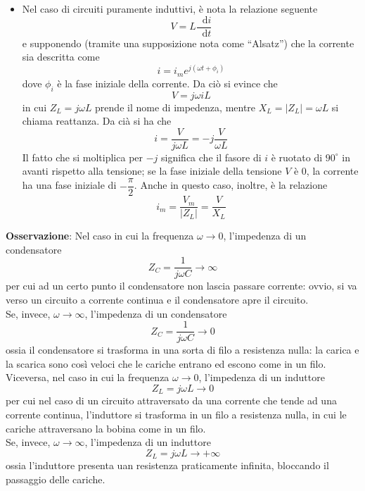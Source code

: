 \documentclass[a4paper]{extarticle}
\newcommand{\quotes}[1]{``#1''}
\newcommand\dif{\mathop{}\!\mathrm{d}}
\begin{document}
\begin{itemize}
  \item Nel caso di circuiti puramente induttivi, è nota la relazione seguente
  \[V=L \dfrac{\dif i}{\dif t}\]
  e supponendo (tramite una supposizione nota come \quotes{Alsatz}) che la corrente sia descritta come
  \[i=i_m e^{j \left(\omega t + \phi_i\right)}\]
  dove $\phi_i$ è la fase iniziale della corrente. Da ciò si evince che
  \[V=j\omega i L\]
  in cui $Z_L=j\omega L$ prende il nome di impedenza, mentre $X_L=\vert Z_L\vert=\omega L$ si chiama reattanza. Da cià si ha che
  \[i=\frac{V}{j \omega L}=-j \frac{V}{\omega L}\]
  Il fatto che si moltiplica per $-j$ significa che il fasore di $i$ è ruotato di $90^\circ$ in avanti rispetto alla tensione; se la fase iniziale della tensione $V$ è $0$, la corrente ha una fase iniziale di $-\dfrac{\pi}{2}$. Anche in questo caso, inoltre, è la relazione
  \[i_m = \dfrac{V_m}{\vert Z_L \vert} = \dfrac{V}{X_L}\]
\end{itemize}

\vspace{2em}
\noindent
\textbf{Osservazione}: Nel caso in cui la frequenza $\omega \to 0$, l'impedenza di un condensatore
\[Z_C = \dfrac{1}{j \omega C} \to \infty\]
per cui ad un certo punto il condensatore non lascia passare corrente: ovvio, si va verso un circuito a corrente continua e il condensatore apre il circuito.\\
Se, invece, $\omega \to \infty$, l'impedenza di un condensatore
\[Z_C = \dfrac{1}{j \omega C} \to 0\]
ossia il condensatore si trasforma in una sorta di filo a resistenza nulla: la carica e la scarica sono così veloci che le cariche entrano ed escono come in un filo.\\
Viceversa, nel caso in cui la frequenza $\omega \to 0$, l'impedenza di un induttore
\[Z_L = j\omega L \to 0\]
per cui nel caso di un circuito attraversato da una corrente che tende ad una corrente continua, l'induttore si trasforma in un filo a resistenza nulla, in cui le cariche attraversano la bobina come in un filo.\\
Se, invece, $\omega \to \infty$, l'impedenza di un induttore
\[Z_L = j \omega L \to +\infty\]
ossia l'induttore presenta uan resistenza praticamente infinita, bloccando il passaggio delle cariche.

\vspace{1em}
\end{document}
